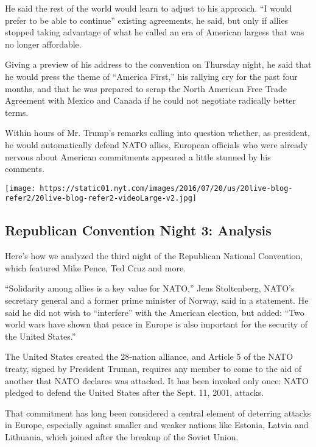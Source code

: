 He said the rest of the world would learn to adjust to his approach. ``I
would prefer to be able to continue'' existing agreements, he said, but
only if allies stopped taking advantage of what he called an era of
American largess that was no longer affordable.

Giving a preview of his address to the convention on Thursday night, he
said that he would press the theme of ``America First,'' his rallying
cry for the past four months, and that he was prepared to scrap the
North American Free Trade Agreement with Mexico and Canada if he could
not negotiate radically better terms.

Within hours of Mr. Trump's remarks calling into question whether, as
president, he would automatically defend NATO allies, European officials
who were already nervous about American commitments appeared a little
stunned by his comments.

\href{https://www.nytimes.com/interactive/2016/07/20/us/elections/gop-convention-speakers.html}{}

\texttt{[image: https://static01.nyt.com/images/2016/07/20/us/20live-blog-refer2/20live-blog-refer2-videoLarge-v2.jpg]}

\hypertarget{republican-convention-night-3-analysis}{%
\subsection{Republican Convention Night 3:
Analysis}\label{republican-convention-night-3-analysis}}

Here's how we analyzed the third night of the Republican National
Convention, which featured Mike Pence, Ted Cruz and more.

``Solidarity among allies is a key value for NATO,'' Jens Stoltenberg,
NATO's secretary general and a former prime minister of Norway, said in
a statement. He said he did not wish to ``interfere'' with the American
election, but added: ``Two world wars have shown that peace in Europe is
also important for the security of the United States.''

The United States created the 28-nation alliance, and Article 5 of the
NATO treaty, signed by President Truman, requires any member to come to
the aid of another that NATO declares was attacked. It has been invoked
only once: NATO pledged to defend the United States after the Sept. 11,
2001, attacks.

That commitment has long been considered a central element of deterring
attacks in Europe, especially against smaller and weaker nations like
Estonia, Latvia and Lithuania, which joined after the breakup of the
Soviet Union.

